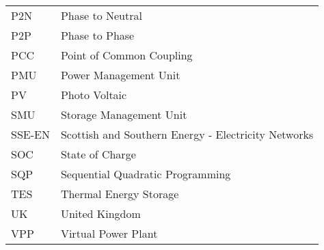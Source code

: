 \begin{table*}[hbt]
  \begin{tabular}{l l}
    P2N & Phase to Neutral\\
    P2P & Phase to Phase\\
    PCC & Point of Common Coupling\\
    PMU & Power Management Unit\\
    PV & Photo Voltaic\\
    SMU & Storage Management Unit\\
    SSE-EN & Scottish and Southern Energy - Electricity Networks\\
    SOC & State of Charge\\
    SQP & Sequential Quadratic Programming\\
    TES & Thermal Energy Storage\\
    UK & United Kingdom\\
    VPP & Virtual Power Plant
  \end{tabular}
\end{table*}
